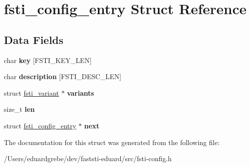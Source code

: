 \hypertarget{structfsti__config__entry}{}\section{fsti\+\_\+config\+\_\+entry Struct Reference}
\label{structfsti__config__entry}
\subsection*{Data Fields}
\begin{DoxyCompactItemize}
\item 
\mbox{\label{structfsti__config__entry_ad93155316f1351abbc99b94a9d781b28}} 
char {\bfseries key} \mbox{[}F\+S\+T\+I\+\_\+\+K\+E\+Y\+\_\+\+L\+EN\mbox{]}
\item 
\mbox{\label{structfsti__config__entry_a31c11ad557aab27565763928b6180363}} 
char {\bfseries description} \mbox{[}F\+S\+T\+I\+\_\+\+D\+E\+S\+C\+\_\+\+L\+EN\mbox{]}
\item 
\mbox{\label{structfsti__config__entry_a0cde1f42c2d28c442930678728cae461}} 
struct \mbox{\hyperlink{structfsti__variant}{fsti\+\_\+variant}} $\ast$ {\bfseries variants}
\item 
\mbox{\label{structfsti__config__entry_ab780e8c7002b1b0dccfbcafe0b7f1216}} 
size\+\_\+t {\bfseries len}
\item 
\mbox{\label{structfsti__config__entry_a3900e815b95ddedbfe86b63639804835}} 
struct \mbox{\hyperlink{structfsti__config__entry}{fsti\+\_\+config\+\_\+entry}} $\ast$ {\bfseries next}
\end{DoxyCompactItemize}


The documentation for this struct was generated from the following file\+:\begin{DoxyCompactItemize}
\item 
/\+Users/eduardgrebe/dev/faststi-\/eduard/src/fsti-\/config.\+h\end{DoxyCompactItemize}
